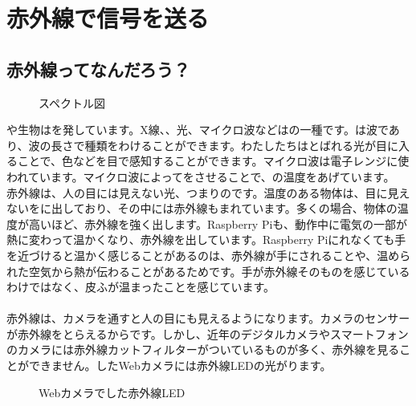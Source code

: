 \documentclass[text05.tex]{subfiles}
\begin{document}
\newpage
\section{赤外線で信号を送る}
\subsection{赤外線ってなんだろう？}

\begin{figure}[H]
\centering

    \caption{スペクトル図}

\end{figure}

や生物はを発しています。X線、、光、マイクロ波などはの一種です。は波であり、波の長さで種類をわけることができます。わたしたちはとばれる光が目に入ることで、色などを目で感知することができます。マイクロ波は電子レンジに使われています。マイクロ波によってをさせることで、の温度をあげています。\\

赤外線は、人の目には見えない光、つまりのです。温度のある物体は、目に見えないをに出しており、その中には赤外線もまれています。多くの場合、物体の温度が高いほど、赤外線を強く出します。Raspberry Piも、動作中に電気の一部が熱に変わって温かくなり、赤外線を出しています。Raspberry Piにれなくても手を近づけると温かく感じることがあるのは、赤外線が手にされることや、温められた空気から熱が伝わることがあるためです。手が赤外線そのものを感じているわけではなく、皮ふが温まったことを感じています。\\\\

赤外線は、カメラを通すと人の目にも見えるようになります。カメラのセンサーが赤外線をとらえるからです。しかし、近年のデジタルカメラやスマートフォンのカメラには赤外線カットフィルターがついているものが多く、赤外線を見ることができません。したWebカメラには赤外線LEDの光がります。

\begin{figure}[H]
    \centering
    
        \caption{Webカメラでした赤外線LED}

\end{figure}
\end{document}
